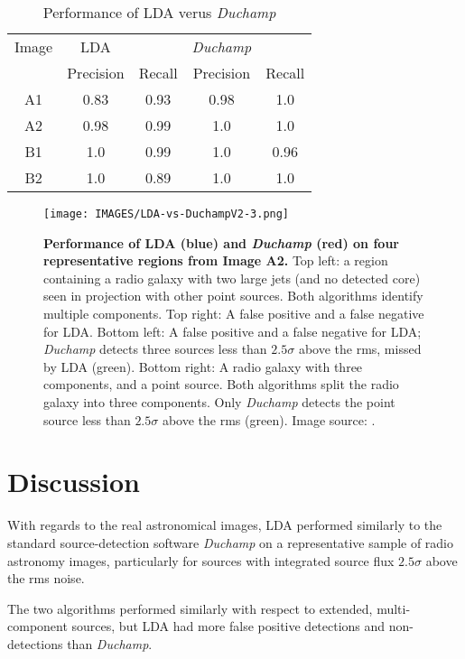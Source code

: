 \begin{table}
\centering
\caption[Comparison of the performance of LDA with \emph{Duchamp}]{Performance of LDA verus \emph{Duchamp}}
\begin{tabular}{c c c c c}
\hline
Image & LDA & &  \emph{Duchamp} & \\
 & Precision & Recall & Precision & Recall \\\hline
A1 & 0.83 & 0.93 & 0.98 & 1.0\\
A2 & 0.98 & 0.99 & 1.0 & 1.0\\
B1 & 1.0 & 0.99 & 1.0 & 0.96\\
B2 & 1.0 & 0.89 & 1.0 & 1.0\\\hline
\end{tabular}
\label{table:LDA-DU}
\end{table}

\begin{figure}
\centering
\texttt{[image: IMAGES/LDA-vs-DuchampV2-3.png]}
\caption[A comparison between LDA and \emph{Duchamp}]{\textbf{Performance of LDA (blue) and \emph{Duchamp} \protect\cite{whiting2012duchamp} (red) on four representative regions from Image A2.} Top left: a region containing a radio galaxy with two large jets (and no detected core) seen in projection with other point sources. Both algorithms identify multiple components. Top right: A false positive and a false negative for LDA.  Bottom left: A false positive and a false negative for LDA; \emph{Duchamp} detects three sources less than $2.5 \sigma$ above the rms, missed by LDA (green). Bottom right: A radio galaxy with three components, and a point source. Both algorithms split the radio galaxy into three components. Only \emph{Duchamp} detects the point source less than $2.5 \sigma$ above the rms (green). Image source: \protect\cite{saripalli2012atlbs,subrahmanyan2010atlbs}.}
\label{fig:ldavsdu}
\end{figure}

\section{Discussion}

With regards to the real astronomical images, LDA performed similarly to the standard source-detection software \emph{Duchamp} \cite{whiting2012duchamp} on a representative sample of radio astronomy images, particularly for sources with integrated source flux $2.5 \sigma$ above the rms noise. 

The two algorithms performed similarly with respect to extended, multi-component sources, but LDA had more false positive detections and non-detections than \emph{Duchamp}. 

